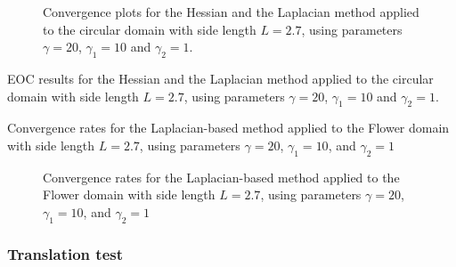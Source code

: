 \begin{figure}[h!]
\centering
\subfloat[Hessian]{}
\subfloat[Laplace]{}

\caption{ Convergence plots for the Hessian and the Laplacian method applied to the circular domain with side length $L=2.7$, using parameters $\gamma=20$, $\gamma_1=10$ and $\gamma_2=1$.}
\label{fig:conv_hes_lap}
\end{figure}



\begin{table}
\begin{minipage}{1.0\textwidth}
    \centering
    \subfloat[Hessian]{}
\end{minipage}%

\bigskip
\begin{minipage}{1.0\textwidth}
    \centering
    \subfloat[Laplace]{}
\end{minipage}
\caption{EOC results for the Hessian and the Laplacian method applied to the circular domain with side length $L=2.7$, using parameters $\gamma=20$, $\gamma_1=10$ and $\gamma_2=1$.}
\label{tab:conv_hes_lap}
\end{table}


\begin{table} 
\caption{Convergence rates for the Laplacian-based method applied to the Flower domain with side length $L=2.7$, using parameters $\gamma=20$, $\gamma_1=10$, and $\gamma_2=1$}
\end{table}
\begin{figure}
    \centering

\caption{Convergence rates for the Laplacian-based method applied to the Flower domain with side length $L=2.7$, using parameters $\gamma=20$, $\gamma_1=10$, and $\gamma_2=1$}
\end{figure}

\subsubsection{Translation test}%
\label{ssub:translation_test}


